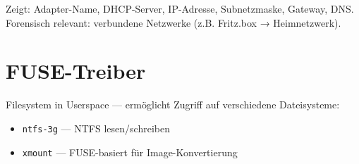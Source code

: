 Zeigt: Adapter-Name, DHCP-Server, IP-Adresse, Subnetzmaske, Gateway, DNS.
Forensisch relevant: verbundene Netzwerke (z.B. Fritz.box → Heimnetzwerk).

\section{FUSE-Treiber}

Filesystem in Userspace — ermöglicht Zugriff auf verschiedene Dateisysteme:
\begin{itemize}
	\item \texttt{ntfs-3g} — NTFS lesen/schreiben
	\item \texttt{xmount} — FUSE-basiert für Image-Konvertierung
\end{itemize}
